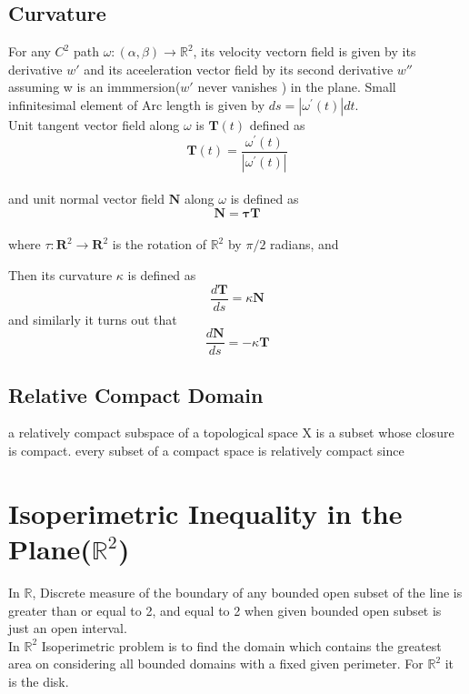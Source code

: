 \documentclass[oneside]{book}
\begin{document}
\subsection{Curvature}

    
For any $C^{2}$ path $\omega:(\alpha, \beta) \rightarrow \mathbb{R}^{2}$, its velocity vectorn field is given by its derivative $w'$ and its aceeleration vector field by its second derivative $w''$ assuming w is an immmersion($w'$ never vanishes ) in the plane.  Small infinitesimal element of Arc length is given by  $d s=\left|\omega^{\prime}(t)\right| d t$.
\\Unit tangent vector field along $\omega$ is $\mathbf{T}(t)$ defined as \\

\begin{equation}  
\textbf{{T}}(t)=\frac{\omega^{\prime}(t)}{\left|\omega^{\prime}(t)\right|}
\end{equation}  \\
and unit normal vector field $\mathbf{N}$ along $\omega$ is defined as 
\begin{equation}
     \mathbf{N}=\mathbf{\tau} \mathbf{T}
\end{equation} \\
   where $ \tau: \mathbf{R}^{2} \rightarrow \mathbf{R}^{2}$ is the rotation of $\mathbb{R}^{2}$ by $\pi / 2$ radians, and

  Then its curvature $\kappa$ is defined as
  \begin{equation}
    \frac{d \mathbf{T}}{d s}=\kappa \mathbf{N}
\end{equation}  and similarly it turns out that \begin{equation}
    \frac{d \mathbf{N}}{d s}=-\kappa \mathbf{T}
\end{equation}

\subsection{Relative Compact Domain}
a relatively compact subspace of a topological space X is a subset whose closure is compact.
every subset of a compact space is relatively compact since
    \







\section{\textbf{Isoperimetric Inequality in the Plane($\mathbb{R}^{2}$)}}
 In $\mathbb{R}$, Discrete measure of the boundary of any bounded open subset of the line is greater than or equal to 2, and equal to 2 when given bounded open subset is just an open interval.\\
  In $\mathbb{R}^{2}$ Isoperimetric problem is to find the domain which contains the greatest area on considering all bounded domains with a fixed given perimeter. For $\mathbb{R}^{2}$ it is the disk. 
\end{document}
